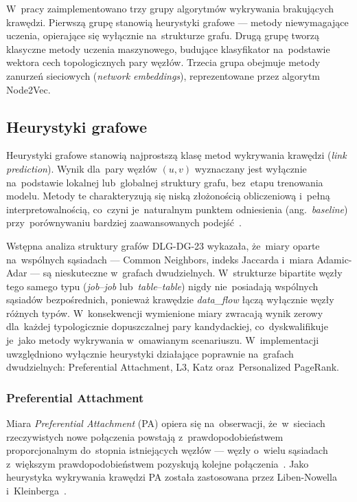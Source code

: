 W~pracy zaimplementowano trzy grupy algorytmów wykrywania
brakujących krawędzi. Pierwszą grupę stanowią heurystyki grafowe
— metody niewymagające uczenia, opierające się wyłącznie na~strukturze
grafu. Drugą grupę tworzą klasyczne metody uczenia maszynowego,
budujące klasyfikator na~podstawie wektora cech topologicznych
pary węzłów. Trzecia grupa obejmuje metody zanurzeń sieciowych
(\emph{network embeddings}), reprezentowane przez algorytm Node2Vec.

\subsection{Heurystyki grafowe}

Heurystyki grafowe stanowią najprostszą klasę metod wykrywania krawędzi
(\emph{link prediction}). Wynik dla~pary węzłów $(u, v)$ wyznaczany jest
wyłącznie na~podstawie lokalnej lub~globalnej struktury grafu, bez~etapu
trenowania modelu. Metody te charakteryzują się niską złożonością
obliczeniową i~pełną interpretowalnością, co~czyni je~naturalnym punktem
odniesienia (ang.\ \emph{baseline}) przy~porównywaniu bardziej
zaawansowanych podejść~\cite{LibenNowell2007}.

Wstępna analiza struktury grafów DLG-DG-23 wykazała, że~miary oparte
na~wspólnych sąsiadach — Common Neighbors, indeks Jaccarda
i~miara Adamic-Adar — są nieskuteczne w~grafach dwudzielnych.
W~strukturze bipartite węzły tego samego typu (\emph{job}--\emph{job}
lub~\emph{table}--\emph{table}) nigdy nie~posiadają wspólnych sąsiadów
bezpośrednich, ponieważ krawędzie \emph{data\_flow} łączą wyłącznie
węzły różnych typów. W~konsekwencji wymienione miary zwracają wynik
zerowy dla~każdej typologicznie dopuszczalnej pary kandydackiej,
co~dyskwalifikuje je~jako metody wykrywania w~omawianym scenariuszu.
W~implementacji uwzględniono wyłącznie heurystyki działające poprawnie
na~grafach dwudzielnych: Preferential Attachment, L3, Katz
oraz~Personalized PageRank.

\subsubsection{Preferential Attachment}

Miara \emph{Preferential Attachment} (PA) opiera się na~obserwacji,
że~w~sieciach rzeczywistych nowe połączenia powstają z~prawdopodobieństwem
proporcjonalnym do~stopnia istniejących węzłów — węzły o~wielu sąsiadach
z~większym prawdopodobieństwem pozyskują kolejne
połączenia~\cite{Barabasi1999}. Jako heurystyka wykrywania krawędzi PA
została zastosowana przez Liben-Nowella i~Kleinberga~\cite{LibenNowell2007}.

